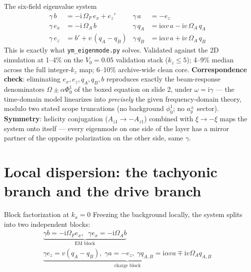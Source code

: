 \documentclass[aspectratio=169,11pt]{beamer}
\newcommand{\Vo}{V_0}
\newcommand{\kz}{k_z}
\newcommand{\OmA}{\Omega_A}
\newcommand{\OmF}{\Omega_F}
\newcommand{\Az}{A_{z1}}
\newcommand{\ii}{\mathrm{i}}
\begin{document}
\begin{frame}{The six-field eigenvalue system}
\footnotesize
\[
\boxed{
\begin{aligned}
\gamma\,b &= -\ii\,\OmF\,e_x+e_z' & \gamma\,a &= -e_z\\
\gamma\,e_x &= -\ii\,\OmA\,b & \gamma\,q_A &= \ii\alpha v\,a-\ii v\,\OmA\,q_A\\
\gamma\,e_z &= b'+v\,(q_A-q_B) & \gamma\,q_B &= \ii\alpha v\,a+\ii v\,\OmA\,q_B
\end{aligned}}
\]
\normalsize
\vspace{0.1em}
This is exactly what \texttt{ym\_eigenmode.py} solves. Validated against the 2D
simulation at 1--4\% on the $\Vo=0.05$ validation stack ($\kz\le5$); 4--9\%
median across the full integer-$\kz$ map; 6--10\% archive-wide clean core.
\vspace{0.1em}
\textbf{Correspondence check}: eliminating $e_x,e_z,q_A,q_B,b$ reproduces exactly
the beam-response denominators $\Omega\pm\alpha\Phi_0^1$ of the boxed equation on
slide 2, under $\omega=\ii\gamma$ — the time-domain model linearizes into
\emph{precisely} the given frequency-domain theory, modulo two stated scope
truncations (no background $\phi_0^1$; no $a_y^\pm$ sector).
\vspace{0.1em}
\textbf{Symmetry}: helicity conjugation ($\Az\to-\Az$) combined with $\xi\to-\xi$
maps the system onto itself — every eigenmode on one side of the layer has a
mirror partner of the opposite polarization on the other side, same $\gamma$.
\end{frame}

\section{Local dispersion: the tachyonic branch and the drive branch}

\begin{frame}{Block factorization at $k_x=0$}
Freezing the background locally, the system splits into two independent blocks:
\[
\begin{gathered}
\underbrace{\gamma b=-\ii\OmF e_x,\;\; \gamma e_x=-\ii\OmA b}_{\text{EM block}}\\[5pt]
\underbrace{\gamma e_z=v(q_A-q_B),\;\gamma a=-e_z,\;\gamma q_{A,B}=\ii\alpha va\mp\ii v\OmA q_{A,B}}_{\text{charge block}}
\end{gathered}
\]
\end{frame}
\end{document}
